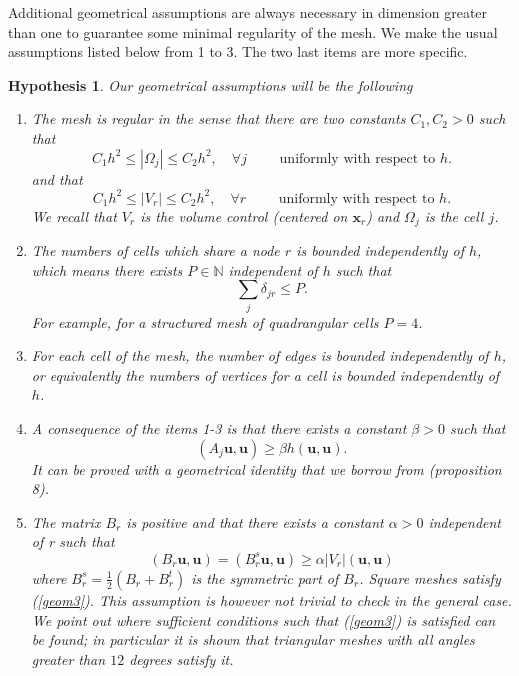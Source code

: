 \documentclass[a4paper,french,english,10pt]{article}
\newcommand\uu{\mathbf{u}}
\newcommand\x{\mathbf{x}}
\newtheorem{hyp}[theorem]{Hypothesis}
\begin{document}
Additional geometrical assumptions are always
necessary in dimension greater than one to guarantee
some minimal regularity of the mesh.
We make  the usual assumptions
 listed below from 1 to 3.
The two last items are more specific.

\begin{hyp}\label{geometrie}
Our geometrical assumptions  will be the following
\begin{enumerate}
\item The mesh is regular in the sense that
there are
two constants $C_1,C_2>0$ such that
\begin{equation} \label{eq:d5}
C_1 h^2 \leq \left| \Omega_j \right| \leq C_2 h^2, \quad \forall j\qquad
\mbox{ uniformly with respect to  }h.
\end{equation}
and that 
\begin{equation} \label{eq:d5.2}
C_1 h^2 \leq \vert V_r \vert \leq C_2 h^2, \quad \forall r\qquad
\mbox{ uniformly with respect to  }h.
\end{equation}
We recall that $V_r$ is the volume control (centered on $\x_r$) and $\Omega_j$
is the cell $j$.
\item The numbers of cells which share  a node $r$ is
bounded independently of $h$, which means there exists 
$P\in \mathbb N$ independent of $h$ such that
\begin{equation}\label{nbmr} 
\sum_j \delta_{jr}\leq P.
\end{equation}
For example, for a structured mesh of quadrangular cells $P=4$.
 
 \item For  each cell of the mesh, the  number of edges is
bounded independently of $h$, or equivalently the numbers of vertices for a cell
 is bounded independently of $h$.

\item 
A consequence of the items 1-3 
is that there exists 
 a constant
$\beta >0 $ such that 
\begin{equation}\label{geom4}
(A_j\uu, \uu)\geq \beta h (\uu,\uu).
\end{equation}
It can be proved with a geometrical  identity that we borrow
 from \cite{de10}  (proposition 8).

\item  The matrix $B_r$ is positive and that there exists a
constant $\alpha >0 $ independent of r such that 
\begin{equation}\label{geom3}
(B_r \uu, \uu)=(B^s_r \uu, \uu)\geq \alpha \vert
V_r\vert (\uu,\uu)
\end{equation}
where $B^s_r=\frac12 (B_r+B_r^t)$ is the symmetric part of $B_r$.
Square meshes satisfy (\ref{geom3}).
This assumption is however not trivial to check in the general case.
We point out  \cite{glaceap} where
 sufficient conditions such that (\ref{geom3}) is satisfied
can be found; in particular it is shown 
that  triangular meshes with all angles greater than $12$ degrees
satisfy it. 
\end{enumerate}
\end{hyp}
\end{document}
